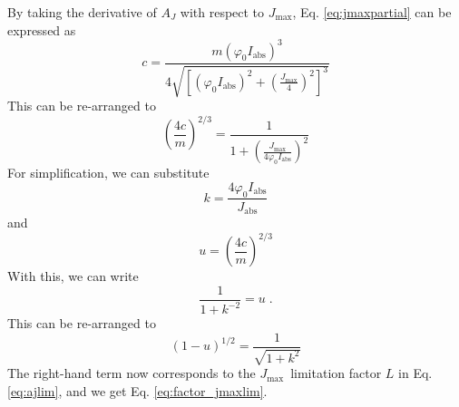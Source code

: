 \documentclass{myreport}
\newcommand{\jmax}{$J_{\text{max}}$}
\begin{document}
By taking the derivative of $A_J$ with respect to \jmax , Eq. \ref{eq:jmaxpartial} can be expressed as
\begin{equation}
    c = \frac{ m (\varphi_0 I_\text{abs})^3}{ 4 \sqrt{ \left[ (\varphi_0 I_\text{abs})^2 + (\frac{J_\text{max}}{4})^2 \right]^3 }}
\end{equation}
This can be re-arranged to
\begin{equation}
    \left(\frac{4c}{m}\right)^{2/3} = \frac{1}{1 + \left( \frac{J_\text{max}}{4\varphi_0 I_\text{abs}}\right)^2}
\end{equation}
For simplification, we can substitute 
\begin{equation}
    k = \frac{4 \varphi_0 I_\text{abs}}{J_\text{abs}}
\end{equation}
and 
\begin{equation}
    u = \left(\frac{4c}{m}\right)^{2/3}
\end{equation}
With this, we can write
\begin{equation}
    \frac{1}{1+k^{-2}} = u \;.
\end{equation}
This can be re-arranged to 
\begin{equation}
    (1-u)^{1/2} = \frac{1}{\sqrt{1+k^2}} 
\end{equation}
The right-hand term now corresponds to the \jmax\ limitation factor $L$ in Eq. \ref{eq:ajlim}, and we get Eq. \ref{eq:factor_jmaxlim}.

\end{document}
